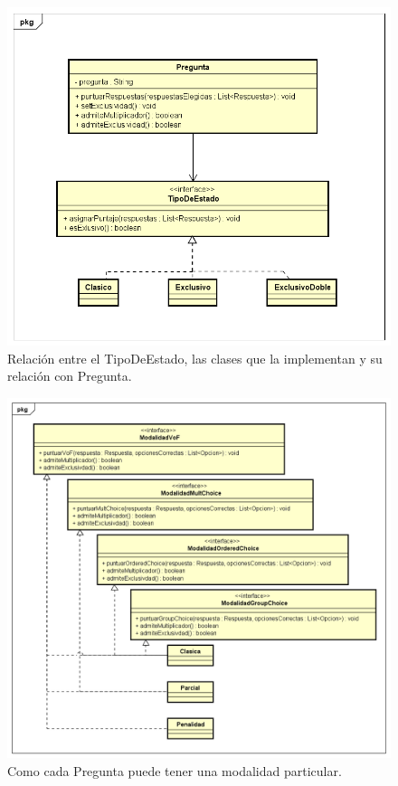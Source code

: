 \documentclass[titlepage,a4paper]{article}
\begin{document}
\begin{figure}[H]
\centering
\includegraphics[width=1\textwidth]{img/UMLClases4.png}
\caption{\label{fig:class01}Relación entre el TipoDeEstado, las clases que la implementan y su relación con Pregunta.}
\end{figure}

\begin{figure}[H]
\centering
\includegraphics[width=1\textwidth]{img/UMLClases5.png}
\caption{\label{fig:class01}Como cada Pregunta puede tener una modalidad particular.}
\end{figure}
\end{document}

